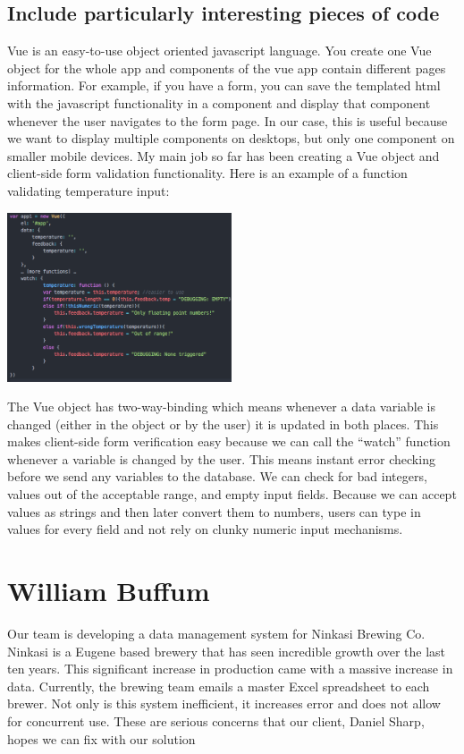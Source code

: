 \documentclass[draftclsnofoot,onecolumn,letterpaper,10pt,compsoc]{IEEEtran}
\begin{document}
\subsection{Include particularly interesting pieces of code}
Vue is an easy-to-use object oriented javascript language. You create one Vue object for the whole app and components of the vue app contain different pages information. For example, if you have a form, you can save the templated html with the javascript functionality in a component and display that component whenever the user navigates to the form page. In our case, this is useful because we want to display multiple components on desktops, but only one component on smaller mobile devices.
My main job so far has been creating a Vue object and client-side form validation functionality. Here is an example of a function validating temperature input:


\centerline{\includegraphics[height=5cm]{screenshots/vuecode.png}}

The Vue object has two-way-binding which means whenever a data variable is changed (either in the object or by the user) it is updated in both places. This makes client-side form verification easy because we can call the “watch” function whenever a variable is changed by the user. This means instant error checking before we send any variables to the database. We can check for bad integers, values out of the acceptable range, and empty input fields. Because we can accept values as strings and then later convert them to numbers, users can type in values for every field and not rely on clunky numeric input mechanisms.

\section{William Buffum}

Our team is developing a data management system for Ninkasi Brewing Co.
Ninkasi is a Eugene based brewery that has seen incredible growth over the last ten years.
This significant increase in production came with a massive increase in data.
Currently, the brewing team emails a master Excel spreadsheet to each brewer.
Not only is this system inefficient, it increases error and does not allow for concurrent use.
These are serious concerns that our client, Daniel Sharp, hopes we can fix with our solution
\end{document}
